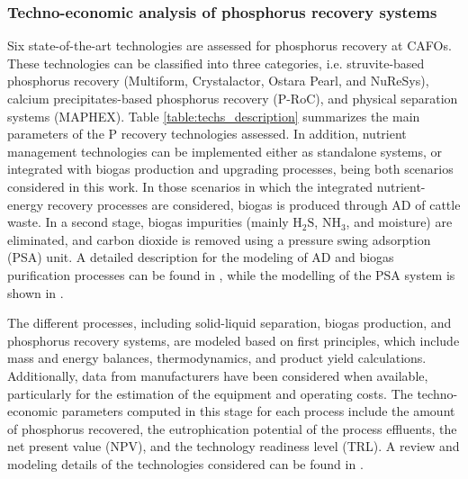 \begin{refsection}[referencesCh5]
\subsubsection{Techno-economic analysis of phosphorus recovery systems}\label{section:TEAPRec}

Six state-of-the-art technologies are assessed for phosphorus recovery at CAFOs. These technologies can be classified into three categories, i.e. struvite-based phosphorus recovery (Multiform, Crystalactor, Ostara Pearl, and NuReSys), calcium precipitates-based phosphorus recovery (P-RoC), and physical separation systems (MAPHEX). Table \ref{table:techs_description} summarizes the main parameters of the P recovery technologies assessed. In addition, nutrient management technologies can be implemented either as standalone systems, or integrated with biogas production and upgrading processes, being both scenarios considered in this work. In those scenarios in which the integrated nutrient-energy recovery processes are considered, biogas is produced through AD of cattle waste. In a second stage, biogas impurities (mainly $\text{H}_2 \text{S}$, $\text{NH}_3$, and moisture) are eliminated, and carbon dioxide is removed using a pressure swing adsorption (PSA) unit. A detailed description for the modeling of AD and biogas purification processes can be found in \citet{Leon}, while the modelling of the PSA system is shown in \citet{MartinHernandez}.

The different processes, including solid-liquid separation, biogas production, and phosphorus recovery systems, are modeled based on first principles, which include mass and energy balances, thermodynamics, and product yield calculations. Additionally, data from manufacturers have been considered when available, particularly for the estimation of 
the equipment and operating costs. The techno-economic parameters computed in this stage for each process include the amount of phosphorus recovered, the eutrophication potential of the process effluents, the net present value (NPV), and the technology readiness level (TRL).
A review and modeling details of the technologies considered can be found in \citet{Tool}.


\end{refsection}
